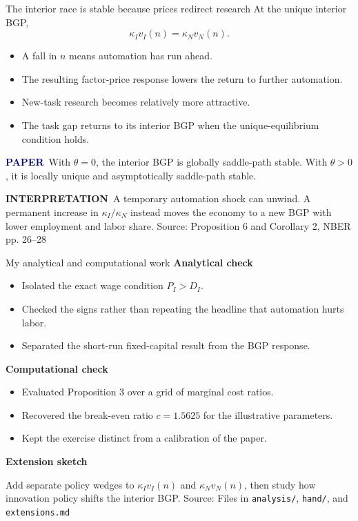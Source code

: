 \documentclass[aspectratio=169,11pt]{beamer}
\newcommand{\source}[1]{\vfill{\tiny\color{muted}Source: #1}}
\newcommand{\paper}{\textcolor{navy}{\textbf{PAPER}}}
\newcommand{\interpretation}{\textcolor{muted}{\textbf{INTERPRETATION}}}
\begin{document}
\begin{frame}{The interior race is stable because prices redirect research}
  At the unique interior BGP,
  \[
    \kappa_Iv_I(n)=\kappa_Nv_N(n).
  \]

  \begin{itemize}
    \item A fall in $n$ means automation has run ahead.
    \item The resulting factor-price response lowers the return to further automation.
    \item New-task research becomes relatively more attractive.
    \item The task gap returns to its interior BGP when the unique-equilibrium condition holds.
  \end{itemize}

  \paper\ With $\theta=0$, the interior BGP is globally saddle-path stable. With $\theta>0$, it is locally unique and asymptotically saddle-path stable.

  \interpretation\ A temporary automation shock can unwind. A permanent increase in $\kappa_I/\kappa_N$ instead moves the economy to a new BGP with lower employment and labor share.
  \source{Proposition 6 and Corollary 2, NBER pp. 26--28}
\end{frame}

\begin{frame}{My analytical and computational work}
  \textbf{Analytical check}
  \begin{itemize}
    \item Isolated the exact wage condition $P_I>D_I$.
    \item Checked the signs rather than repeating the headline that automation hurts labor.
    \item Separated the short-run fixed-capital result from the BGP response.
  \end{itemize}

  \medskip
  \textbf{Computational check}
  \begin{itemize}
    \item Evaluated Proposition 3 over a grid of marginal cost ratios.
    \item Recovered the break-even ratio $c=1.5625$ for the illustrative parameters.
    \item Kept the exercise distinct from a calibration of the paper.
  \end{itemize}

  \medskip
  \textbf{Extension sketch}

  Add separate policy wedges to $\kappa_Iv_I(n)$ and $\kappa_Nv_N(n)$, then study how innovation policy shifts the interior BGP.
  \source{Files in \texttt{analysis/}, \texttt{hand/}, and \texttt{extensions.md}}
\end{frame}
\end{document}
